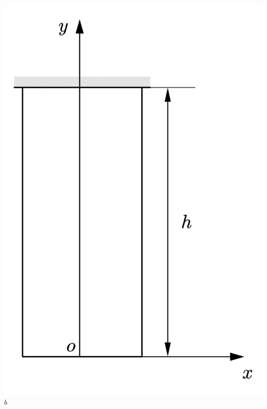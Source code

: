 \begin{center}
\begin{minipage}[c]{0.3\textwidth}
	\includegraphics[scale=0.3]{figure/2-6.png}\\
	$b$
\end{minipage}
\end{center}

